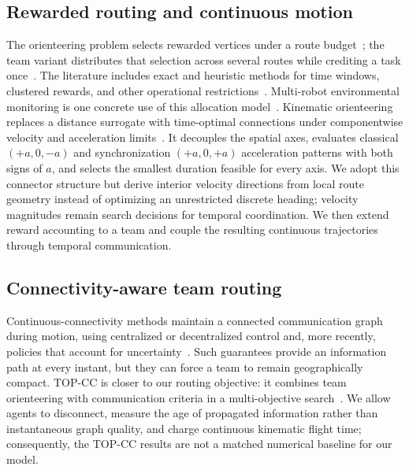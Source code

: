 \subsection{Rewarded routing and continuous motion}
The orienteering problem selects rewarded vertices under a route budget~\cite{golden1987orienteering}; the team variant distributes that selection across several routes while crediting a task once~\cite{chao1996team}. The literature includes exact and heuristic methods for time windows, clustered rewards, and other operational restrictions~\cite{gunawan2016survey}. Multi-robot environmental monitoring is one concrete use of this allocation model~\cite{mansfield2021multirobot}. Kinematic orienteering replaces a distance surrogate with time-optimal connections under componentwise velocity and acceleration limits~\cite{meyer2022kop}. It decouples the spatial axes, evaluates classical $(+a,0,-a)$ and synchronization $(+a,0,+a)$ acceleration patterns with both signs of $a$, and selects the smallest duration feasible for every axis. We adopt this connector structure but derive interior velocity directions from local route geometry instead of optimizing an unrestricted discrete heading; velocity magnitudes remain search decisions for temporal coordination. We then extend reward accounting to a team and couple the resulting continuous trajectories through temporal communication.

\subsection{Connectivity-aware team routing}
Continuous-connectivity methods maintain a connected communication graph during motion, using centralized or decentralized control and, more recently, policies that account for uncertainty~\cite{yang2010decentralized,li2021decentralized,shetty2023decentralized}. Such guarantees provide an information path at every instant, but they can force a team to remain geographically compact. TOP-CC is closer to our routing objective: it combines team orienteering with communication criteria in a multi-objective search~\cite{topcc}. We allow agents to disconnect, measure the age of propagated information rather than instantaneous graph quality, and charge continuous kinematic flight time; consequently, the TOP-CC results are not a matched numerical baseline for our model.

